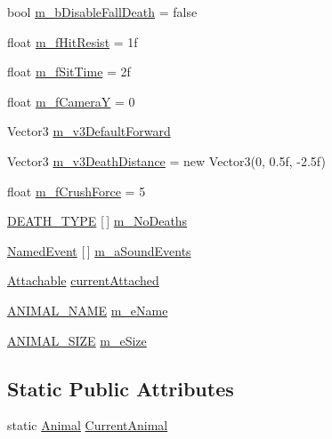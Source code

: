 \begin{DoxyCompactItemize}
bool \mbox{\hyperlink{class_animal_a8cb1a64819aedbdff4212914cfd3dd7c}{m\+\_\+b\+Disable\+Fall\+Death}} = false
\item 
float \mbox{\hyperlink{class_animal_a228164375564588094f7ddd820f5d859}{m\+\_\+f\+Hit\+Resist}} = 1f
\item 
float \mbox{\hyperlink{class_animal_a9df81cf498acab378f652ba5257b8370}{m\+\_\+f\+Sit\+Time}} = 2f
\item 
float \mbox{\hyperlink{class_animal_ad159aee4f8a2e5277b2eb5fce15ac797}{m\+\_\+f\+CameraY}} = 0
\item 
Vector3 \mbox{\hyperlink{class_animal_a48be84620d7945ca70a60ec8a8ca9578}{m\+\_\+v3\+Default\+Forward}}
\item 
Vector3 \mbox{\hyperlink{class_animal_ab80a1e845a4ff60c8d6e227cd48f8633}{m\+\_\+v3\+Death\+Distance}} = new Vector3(0, 0.\+5f, -\/2.\+5f)
\item 
float \mbox{\hyperlink{class_animal_a1d872c88c79887ee4d66dfee7e653081}{m\+\_\+f\+Crush\+Force}} = 5
\item 
\mbox{\hyperlink{_animal_8cs_aa09ea87b75a706096f010aef7b9b1826}{D\+E\+A\+T\+H\+\_\+\+T\+Y\+PE}} \mbox{[}$\,$\mbox{]} \mbox{\hyperlink{class_animal_a56374f904c3f6e99ba03fadd06e94800}{m\+\_\+\+No\+Deaths}}
\item 
\mbox{\hyperlink{class_animal_1_1_named_event}{Named\+Event}} \mbox{[}$\,$\mbox{]} \mbox{\hyperlink{class_animal_a7c8b3a199529db24d4177f96cc34f435}{m\+\_\+a\+Sound\+Events}}
\item 
\mbox{\hyperlink{class_attachable}{Attachable}} \mbox{\hyperlink{class_animal_a9bed81572e69bafb08e1ee7fe8fbe944}{current\+Attached}}
\item 
\mbox{\hyperlink{_animal_8cs_a2fa5713399b84d1b88dae9196837af50}{A\+N\+I\+M\+A\+L\+\_\+\+N\+A\+ME}} \mbox{\hyperlink{class_animal_a1d3cac16f6206eb338093a632d644d9f}{m\+\_\+e\+Name}}
\item 
\mbox{\hyperlink{_animal_8cs_ad0d15cd79bb3e3a97e7fb817f1438fcc}{A\+N\+I\+M\+A\+L\+\_\+\+S\+I\+ZE}} \mbox{\hyperlink{class_animal_a832155594812fbbf3b2ed1a698835ee0}{m\+\_\+e\+Size}}
\end{DoxyCompactItemize}
\subsection*{Static Public Attributes}
\begin{DoxyCompactItemize}
\item 
static \mbox{\hyperlink{class_animal}{Animal}} \mbox{\hyperlink{class_animal_aa0ed151e61e4543ea3b6b176792cf4f5}{Current\+Animal}}
\end{DoxyCompactItemize}
